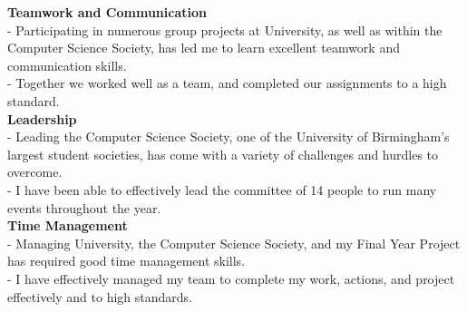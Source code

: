 \documentclass[twoside]{article}
\begin{document}
\textbf{Teamwork and Communication}\\
- Participating in numerous group projects at University, as well as within the Computer Science Society, has led me to learn excellent teamwork and communication skills.\\
- Together we worked well as a team, and completed our assignments to a high standard.\\
\textbf{Leadership}\\
- Leading the Computer Science Society, one of the University of Birmingham's largest student societies, has come with a variety of challenges and hurdles to overcome.\\
- I have been able to effectively lead the committee of 14 people to run many events throughout the year.\\
\textbf{Time Management}\\
- Managing University, the Computer Science Society, and my Final Year Project has required good time management skills.\\
- I have effectively managed my team to complete my work, actions, and project effectively and to high standards.\\
\end{document}
